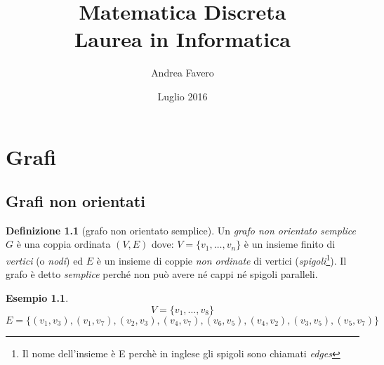 \documentclass[a4paper, openany]{book}
\theoremstyle{plain}
\theoremstyle{definition}
\newtheorem{defn}{Definizione}[chapter]
\newtheorem{ese}{Esempio}[section]
\begin{document}
\title{Matematica Discreta\\Laurea in Informatica}
\author{Andrea Favero}
\date{Luglio 2016}
\maketitle


\tableofcontents    %


\chapter{Grafi}

\section{Grafi non orientati}

\begin{defn}[grafo non orientato semplice]	
Un \emph{grafo non orientato semplice} $G$ è una coppia ordinata $(V,E)$ dove: $V=\{v_1,\dots,v_n\}$ è
un insieme finito di \emph{vertici} (o \emph{nodi}) ed $E$ è un insieme di coppie
\emph{non ordinate} di vertici 
(\emph{spigoli}\footnote{Il nome dell'insieme è E perchè in inglese gli spigoli 
sono chiamati \emph{edges}}).
Il grafo è detto \emph{semplice} perché non può avere né cappi né spigoli paralleli.
\end{defn}

\begin{ese}
\[V = \{ v_1, \dots, v_8 \}\]
\[ E = \{ (v_1,v_3), (v_1,v_7), (v_2,v_3), (v_4,v_7), (v_6,v_5), (v_4,v_2), (v_3,v_5), (v_5,v_7) \}\]
\end{ese}

\begin{figure}[h]
    \centering
\end{figure}
\end{document}
